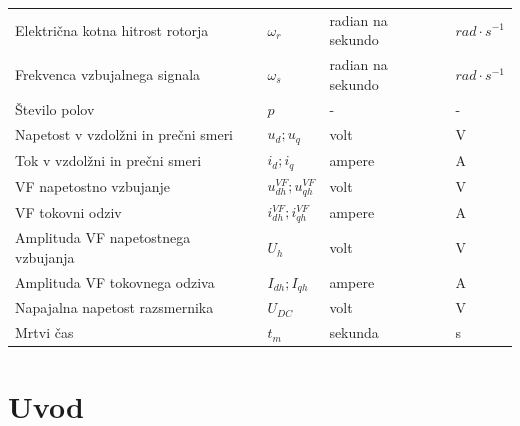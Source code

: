 \documentclass[a4paper,twoside,openright,12pt,slovene]{book}
\begin{document}
\begin{center}
\begin{tabular}{*{4}{l}}
        Električna kotna hitrost rotorja                           & $\omega_r$                             & radian na sekundo    & $rad \cdot s^{-1}$     \\
        Frekvenca vzbujalnega signala                              & $\omega_{s}$                           & radian na sekundo    & $rad \cdot s^{-1}$     \\
        Število polov                                              & $p$                                    & -                    & -                      \\
        Napetost v vzdolžni in prečni smeri                        & $u_{d}; u_{q}$                         & volt                 & V                      \\
        Tok v vzdolžni in prečni smeri                             & $i_{d}; i_{q}$                         & ampere               & A                      \\
        VF napetostno vzbujanje                                    & $u^{VF}_{dh}; u^{VF}_{qh}$             & volt                 & V                      \\
        VF tokovni odziv                                           & $i^{VF}_{dh}; i^{VF}_{qh}$             & ampere               & A                      \\
        Amplituda VF napetostnega vzbujanja                        & $U_h$                                  & volt                 & V                      \\
        Amplituda VF tokovnega odziva                              & $I_{dh}; I_{qh}$                       & ampere               & A                      \\
        Napajalna napetost razsmernika                             & $U_{DC}$                               & volt                 & V                      \\
        Mrtvi čas                                                  & $t_m$                                  & sekunda              & s                      \\
    \end{tabular}
\end{center}

\mainmatter

\chapter{Uvod} \label{uvod}
\end{document}
